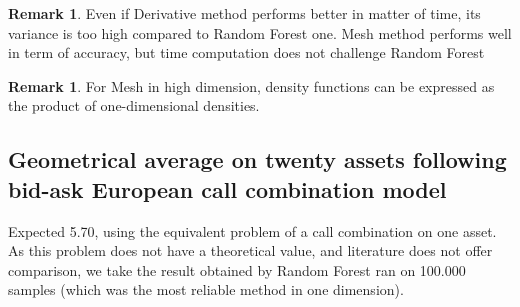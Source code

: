 \documentclass[english,11pt,openany]{report}
\theoremstyle{definition}
\theoremstyle{plain}
\theoremstyle{definition}
\newtheorem{Rem}[Th]{Remark}
\begin{document}
\begin{Rem}
	Even if Derivative method performs better in matter of time, its variance is too high compared to Random Forest one. 
	Mesh method performs well in term of accuracy, but time computation does not challenge Random Forest 
\end{Rem}

\begin{Rem}
	For Mesh in high dimension, density functions can be expressed as the product of one-dimensional densities.
\end{Rem}

\subsection{Geometrical average on twenty assets following bid-ask European call combination model}

Expected 5.70, using the equivalent problem of a call combination on one asset. As this problem does not have a theoretical value, and literature does not offer comparison, we take the result obtained by Random Forest ran on 100.000 samples (which was the most reliable method in one dimension). 
\end{document}
